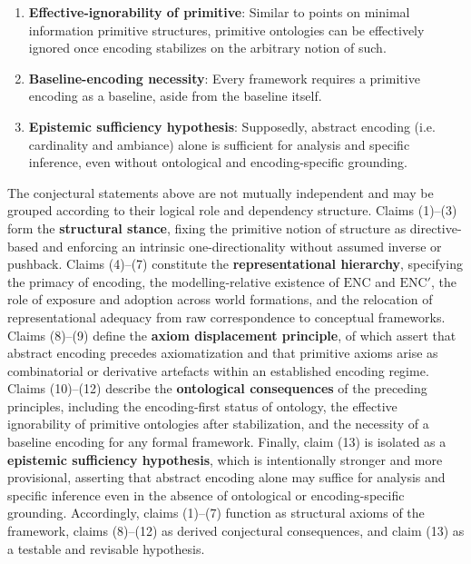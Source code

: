 \begin{conjecture}
\begin{enumerate}[leftmargin=0.5cm,itemsep=1pt,topsep=1pt]
		\item \textbf{Effective-ignorability of primitive}: Similar to points on minimal information primitive structures, primitive ontologies can be effectively ignored once encoding stabilizes on the arbitrary notion of such. 
		\item \textbf{Baseline-encoding necessity}: Every framework requires a primitive encoding as a baseline, aside from the baseline itself. 
		\item \textbf{Epistemic sufficiency hypothesis}: Supposedly, abstract encoding (i.e. cardinality and ambiance) alone is sufficient for analysis and specific inference, even without ontological and encoding-specific grounding. 
	\end{enumerate}
	The conjectural statements above are not mutually independent and may be grouped according to their logical role and dependency structure. Claims (1)--(3) form the \textbf{structural stance}, fixing the primitive notion of structure as directive-based and enforcing an intrinsic one-directionality without assumed inverse or pushback. Claims (4)--(7) constitute the \textbf{representational hierarchy}, specifying the primacy of encoding, the modelling-relative existence of $\mathrm{ENC}$ and $\mathrm{ENC}'$, the role of exposure and adoption across world formations, and the relocation of representational adequacy from raw correspondence to conceptual frameworks. Claims (8)--(9) define the \textbf{axiom displacement principle}, of which assert that abstract encoding precedes axiomatization and that primitive axioms arise as combinatorial or derivative artefacts within an established encoding regime. Claims (10)--(12) describe the \textbf{ontological consequences} of the preceding principles, including the encoding-first status of ontology, the effective ignorability of primitive ontologies after stabilization, and the necessity of a baseline encoding for any formal framework. Finally, claim (13) is isolated as a \textbf{epistemic sufficiency hypothesis}, which is intentionally stronger and more provisional, asserting that abstract encoding alone may suffice for analysis and specific inference even in the absence of ontological or encoding-specific grounding. Accordingly, claims (1)--(7) function as structural axioms of the framework, claims (8)--(12) as derived conjectural consequences, and claim (13) as a testable and revisable hypothesis.
\end{conjecture}
